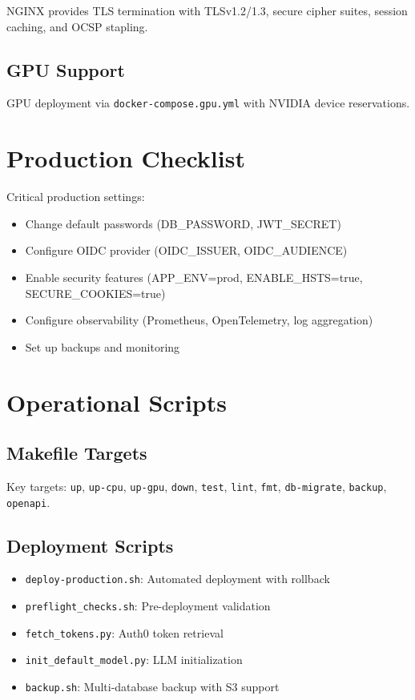\documentclass[a4paper,twoside]{sapthesis}
\begin{document}
NGINX provides TLS termination with TLSv1.2/1.3, secure cipher suites, session caching, and OCSP stapling.

\subsection{GPU Support}

GPU deployment via \texttt{docker-compose.gpu.yml} with NVIDIA device reservations.

\section{Production Checklist}
\label{sec:production-checklist}

Critical production settings:
\begin{itemize}
    \item Change default passwords (DB\_PASSWORD, JWT\_SECRET)
    \item Configure OIDC provider (OIDC\_ISSUER, OIDC\_AUDIENCE)
    \item Enable security features (APP\_ENV=prod, ENABLE\_HSTS=true, SECURE\_COOKIES=true)
    \item Configure observability (Prometheus, OpenTelemetry, log aggregation)
    \item Set up backups and monitoring
\end{itemize}

\section{Operational Scripts}
\label{sec:operational-scripts}

\subsection{Makefile Targets}

Key targets: \texttt{up}, \texttt{up-cpu}, \texttt{up-gpu}, \texttt{down}, \texttt{test}, \texttt{lint}, \texttt{fmt}, \texttt{db-migrate}, \texttt{backup}, \texttt{openapi}.

\subsection{Deployment Scripts}

\begin{itemize}
    \item \texttt{deploy-production.sh}: Automated deployment with rollback
    \item \texttt{preflight\_checks.sh}: Pre-deployment validation
    \item \texttt{fetch\_tokens.py}: Auth0 token retrieval
    \item \texttt{init\_default\_model.py}: LLM initialization
    \item \texttt{backup.sh}: Multi-database backup with S3 support
\end{itemize}
\end{document}
